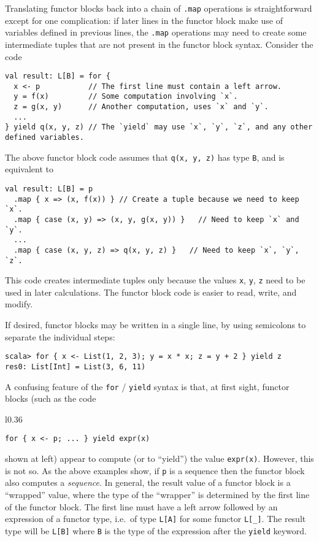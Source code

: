 Translating functor blocks back into a chain of \lstinline!.map!
operations is straightforward except for one complication: if later
lines in the functor block make use of variables defined in previous
lines, the \lstinline!.map! operations may need to create some intermediate
tuples that are not present in the functor block syntax. Consider
the code
\begin{lstlisting}
val result: L[B] = for {
  x <- p           // The first line must contain a left arrow.
  y = f(x)         // Some computation involving `x`.
  z = g(x, y)      // Another computation, uses `x` and `y`.
  ...
} yield q(x, y, z) // The `yield` may use `x`, `y`, `z`, and any other defined variables.
\end{lstlisting}
The above functor block code assumes that \lstinline!q(x, y, z)!
has type \lstinline!B!, and is equivalent to
\begin{lstlisting}
val result: L[B] = p
  .map { x => (x, f(x)) } // Create a tuple because we need to keep `x`.
  .map { case (x, y) => (x, y, g(x, y)) }   // Need to keep `x` and `y`.
  ...
  .map { case (x, y, z) => q(x, y, z) }   // Need to keep `x`, `y`, `z`.
\end{lstlisting}
This code creates intermediate tuples only because the values \lstinline!x!,
\lstinline!y!, \lstinline!z! need to be used in later calculations.
The functor block code is easier to read, write, and modify. 

If desired, functor blocks may be written in a single line, by using
semicolons to separate the individual steps:
\begin{lstlisting}
scala> for { x <- List(1, 2, 3); y = x * x; z = y + 2 } yield z
res0: List[Int] = List(3, 6, 11)
\end{lstlisting}

A confusing feature of the \lstinline!for! / \lstinline!yield! syntax
is that, at first sight, functor blocks (such as the code\begin{wrapfigure}{l}{0.36\columnwidth}%
\vspace{-0.8\baselineskip}
\begin{lstlisting}
for { x <- p; ... } yield expr(x)
\end{lstlisting}

\vspace{-0.8\baselineskip}
\end{wrapfigure}%
 shown at left) appear to compute (or to ``yield'') the value \lstinline!expr(x)!.
However, this is not so. As the above examples show, if \lstinline!p!
is a sequence then the functor block also computes a \emph{sequence}.
In general, the result value of a functor block is a ``wrapped''
value, where the type of the ``wrapper'' is determined by the first
line of the functor block. The first line must have a left arrow followed
by an expression of a functor type, i.e.~of type \lstinline!L[A]!
for some functor \lstinline!L[_]!. The result type will be \lstinline!L[B]!
where \lstinline!B! is the type of the expression after the \lstinline!yield!
keyword.

